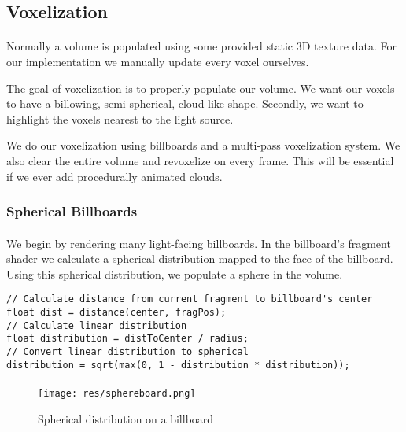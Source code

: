 \subsection{Voxelization}\paragraph{}
Normally a volume is populated using some provided static 3D texture data.  For our implementation we manually update every voxel ourselves. 

The goal of voxelization is to properly populate our volume. We want our voxels to have a billowing, semi-spherical, cloud-like shape. Secondly, we want to highlight the voxels nearest to the light source. 

We do our voxelization using billboards and a multi-pass voxelization system. We also clear the entire volume and revoxelize on every frame. This will be essential if we ever add procedurally animated clouds. 

\subsubsection{Spherical Billboards}\paragraph{}
We begin by rendering many light-facing billboards. In the billboard's fragment shader we calculate a spherical distribution mapped to the face of the billboard. Using this spherical distribution, we populate a sphere in the volume. 

\begin{lstlisting}[caption={first\_voxelize.glsl, 42}]
// Calculate distance from current fragment to billboard's center
float dist = distance(center, fragPos);
// Calculate linear distribution
float distribution = distToCenter / radius;
// Convert linear distribution to spherical
distribution = sqrt(max(0, 1 - distribution * distribution));
\end{lstlisting}\paragraph{}

\begin{figure}
\caption{Spherical distribution on a billboard}
\texttt{[image: res/sphereboard.png]}
\end{figure}

